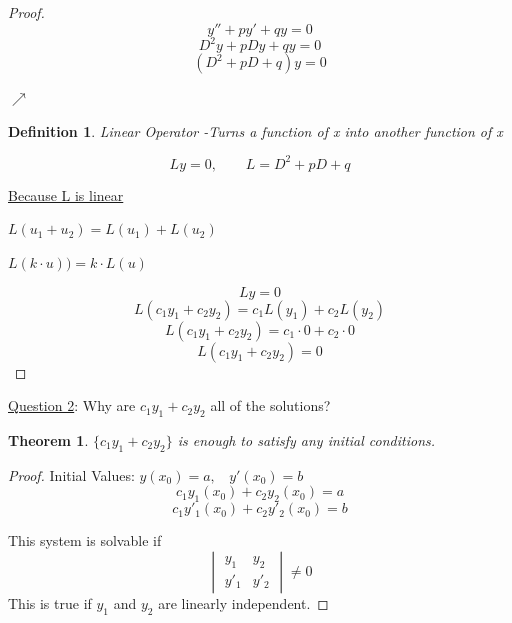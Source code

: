 \documentclass[12pt]{article}
\newtheorem{definition}{Definition}[section]
\numberwithin{equation}{subsection}
\newtheorem{theorem}{Theorem}[section]
\newcommand{\indj}{\hspace{5cm}}
\newcommand{\indq}{\hspace{8.5cm}}
\newcommand{\indr}{\hspace{9cm}}
\begin{document}
\begin{proof}
\begin{equation}
y''+py'+qy=0
\end{equation}
\begin{equation}
D^2y+pDy+qy=0
\end{equation}
\begin{equation}
(D^2+pD+q)y=0
\end{equation}

\indj $ \nearrow$ 
\begin{definition}{Linear Operator}
-Turns a function of x into another function of x
\end{definition}

\begin{equation}
Ly=0,\ \ \ \ \ \ \ \ \ L=D^2+pD+q
\end{equation}

\indr \underline{Because L is linear}

\indq $L(u_1+u_2)=L(u_1)+L(u_2)$

\indr $L(k \cdot u))=k \cdot L(u)$

\begin{equation}
Ly=0
\end{equation}
\begin{equation}
L(c_1y_1+c_2y_2)=c_1L(y_1)+c_2L(y_2)
\end{equation}
\begin{equation}
L(c_1y_1+c_2y_2)=c_1 \cdot 0 + c_2 \cdot 0
\end{equation}
\begin{equation}
L(c_1y_1+c_2y_2)=0
\end{equation}
\end{proof}


\noindent \underline{Question 2}: Why are $c_1y_1+c_2y_2$ all of the solutions?

\begin{theorem}
$\{ c_1y_1+c_2y_2\}$ is enough to satisfy any  initial conditions.
\end{theorem}

\begin{proof}
Initial Values: $y(x_0)=a, \ \ \ \ y'(x_0)=b$
\begin{equation}
c_1y_1(x_0)+c_2y_2(x_0)=a
\end{equation}
\begin{equation}
c_1y'_1(x_0)+c_2y'_2(x_0)=b
\end{equation}

This system is solvable if 
\begin{equation}
\begin{vmatrix}
y_1 & y_2\\
y'_1 & y'_2
\end{vmatrix}
\neq 0
\end{equation}
This is true if $y_1$ and $y_2$ are linearly independent. 


\end{proof}
\end{document}
